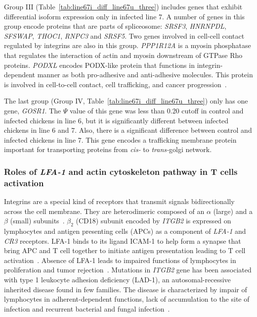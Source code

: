 \documentclass[10pt]{article}
\begin{document}
Group III (Table~\ref{tab:line67i_diff_line67u_three}) includes genes that
exhibit differential isoform expression only in infected line 7.  A number of
genes in this group encode proteins that are parts of spliceosome: {\em SRSF3},
{\em HNRNPDL}, {\em SFSWAP}, {\em THOC1}, {\em RNPC3} and {\em SRSF5}.  Two
genes involved in cell-cell contact regulated by integrins are also in this
group.  {\em PPP1R12A} is a myosin phosphatase that regulates the interaction of
actin and myosin downstream of GTPase Rho proteins.  {\em PODXL} encodes
PODX-like protein that functions in integrin-dependent manner as both
pro-adhesive and anti-adhesive molecules.  This protein is involved in
cell-to-cell contact, cell trafficking, and cancer progression~\cite{}.

The last group (Group IV, Table~\ref{tab:line67i_diff_line67u_three}) only has
one gene, {\em GOSR1}.  The $\Psi$ value of this gene was less than 0.20 cutoff
in control and infected chickens in line 6, but it is significantly different
between infected chickens in line 6 and 7.  Also, there is a significant
difference between control and infected chickens in line 7.  This gene encodes a
trafficking membrane protein important for transporting proteins from {\em cis-}
to {\em trans-}golgi network.

\subsubsection*{Roles of {\em LFA-1} and actin cytoskeleton pathway in T cells
activation}

Integrins are a special kind of receptors that transmit signals bidirectionally
across the cell membrane.  They are heterodimeric composed of an $\alpha$
(large) and a $\beta$ (small) subunits~\cite{wang2010immunopathologies}.
$\beta_{2}$ (CD18) subunit encoded by {\em ITGB2} is expressed on lymphocytes
and antigen presenting cells (APCs) as a component of {\em LFA-1} and {\em CR3}
receptors.  LFA-1 binds to its ligand ICAM-1 to help form a synapse that bring
APC and T cell together to initiate antigen presentation leading to T cell
activation~\cite{dustin2000immunological}.  Absence of LFA-1 leads to impaired
functions of lymphocytes in proliferation and tumor
rejection~\cite{scharffetter1998spontaneous,schmits1996lfa}.  Mutations in {\em
ITGB2} gene has been associated with type 1 leukocyte adhesion deficiency
(LAD-1), an autosomal-recessive inherited disease found in few families.  The
disease is characterized by impair of lymphocytes in adherent-dependent
functions, lack of accumulation to the site of infection and recurrent bacterial
and fungal infection~\cite{springer1987lymphocyte}.
\end{document}
